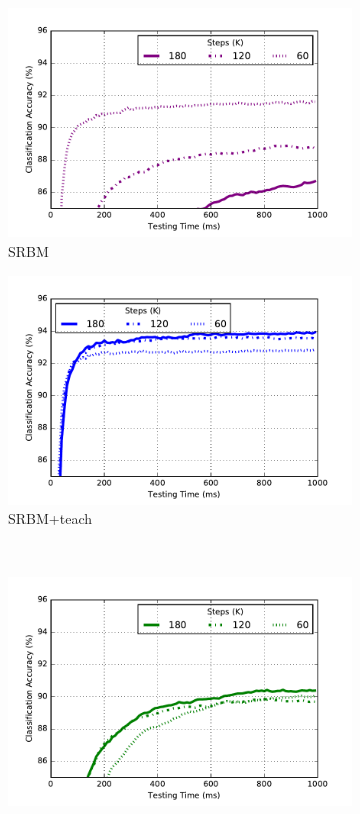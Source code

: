 \begin{figure}
	\centering
	\begin{subfigure}[t]{0.4\textwidth}
		\includegraphics[width=\textwidth]{pics_sdlm/50_MNIST_SRBM_original/latency.pdf}
		\caption{SRBM}
	\end{subfigure}
	\begin{subfigure}[t]{0.4\textwidth}
		\includegraphics[width=\textwidth]{pics_sdlm/51_MNIST_SRBM_teach/latency.pdf}
		\caption{SRBM+teach}
	\end{subfigure}\\
	\begin{subfigure}[t]{0.4\textwidth}
		\includegraphics[width=\textwidth]{pics_sdlm/noise_rbm/latency.pdf}

\end{subfigure}
\end{figure}
